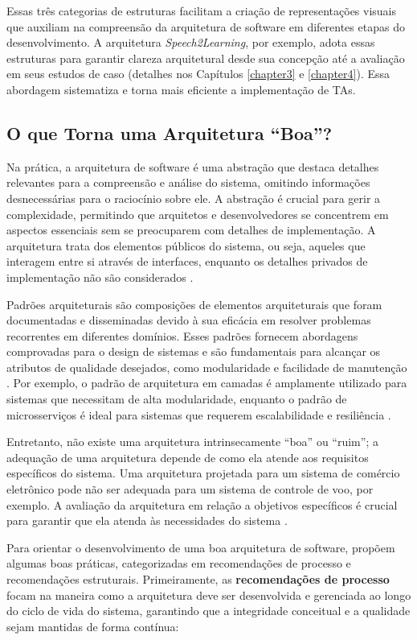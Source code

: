 Essas três categorias de estruturas facilitam a criação de representações visuais que auxiliam na compreensão da arquitetura de software em diferentes etapas do desenvolvimento. A arquitetura \textit{Speech2Learning}, por exemplo, adota essas estruturas para garantir clareza arquitetural desde sua concepção até a avaliação em seus estudos de caso (detalhes nos Capítulos \ref{chapter3} e \ref{chapter4}). Essa abordagem sistematiza e torna mais eficiente a implementação de TAs.

\subsection{O que Torna uma Arquitetura ``Boa''?}

Na prática, a arquitetura de software é uma abstração que destaca detalhes relevantes para a compreensão e análise do sistema, omitindo informações desnecessárias para o raciocínio sobre ele. A abstração é crucial para gerir a complexidade, permitindo que arquitetos e desenvolvedores se concentrem em aspectos essenciais sem se preocuparem com detalhes de implementação. A arquitetura trata dos elementos públicos do sistema, ou seja, aqueles que interagem entre si através de interfaces, enquanto os detalhes privados de implementação não são considerados \cite{Bass2021}.

Padrões arquiteturais são composições de elementos arquiteturais que foram documentadas e disseminadas devido à sua eficácia em resolver problemas recorrentes em diferentes domínios. Esses padrões fornecem abordagens comprovadas para o design de sistemas e são fundamentais para alcançar os atributos de qualidade desejados, como modularidade e facilidade de manutenção \cite{Bass2021}. Por exemplo, o padrão de arquitetura em camadas é amplamente utilizado para sistemas que necessitam de alta modularidade, enquanto o padrão de microsserviços é ideal para sistemas que requerem escalabilidade e resiliência \cite{Pressman2016, Sommerville2015}.

Entretanto, não existe uma arquitetura intrinsecamente ``boa'' ou ``ruim''; a adequação de uma arquitetura depende de como ela atende aos requisitos específicos do sistema. Uma arquitetura projetada para um sistema de comércio eletrônico pode não ser adequada para um sistema de controle de voo, por exemplo. A avaliação da arquitetura em relação a objetivos específicos é crucial para garantir que ela atenda às necessidades do sistema \cite{Pressman2016, Sommerville2015}.

Para orientar o desenvolvimento de uma boa arquitetura de software,  propõem algumas boas práticas, categorizadas em recomendações de processo e recomendações estruturais. Primeiramente, as \textbf{recomendações de processo} focam na maneira como a arquitetura deve ser desenvolvida e gerenciada ao longo do ciclo de vida do sistema, garantindo que a integridade conceitual e a qualidade sejam mantidas de forma contínua:

